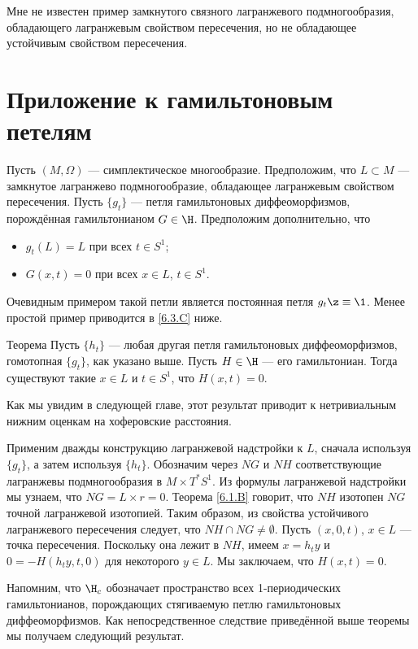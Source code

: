 Мне не известен пример замкнутого связного лагранжевого подмногообразия, обладающего лагранжевым свойством пересечения, но не обладающее устойчивым свойством пересечения.


\section{Приложение к гамильтоновым петелям}

Пусть $(M, \Omega)$ --- симплектическое многообразие.
Предположим, что $L \subset M$ --- замкнутое лагранжево подмногообразие, обладающее лагранжевым свойством пересечения.
Пусть $\{g_t\}$ --- петля гамильтоновых диффеоморфизмов, порождённая гамильтонианом $G \in \H$.
Предположим дополнительно, что
\begin{itemize}
\item $g_t (L) = L$ при всех $t \in S^1$; 
\item $G (x, t) = 0$ при всех $x \in L$, $t \in S^1$.
\end{itemize}
Очевидным примером такой петли является постоянная петля $g_t \z\equiv \1$.
Менее простой пример приводится в \ref{6.3.C} ниже.

\begin{thm}{Теорема}\label{6.3.A}
Пусть $\{h_t\}$ --- любая другая петля гамильтоновых диффеоморфизмов, гомотопная $\{g_t\}$, как указано выше.
Пусть $H \in \H$ --- его гамильтониан.
Тогда существуют такие $x \in L$ и $t \in S^1$, что $H (x, t) = 0$.
\end{thm}

Как мы увидим в следующей главе, этот результат приводит к нетривиальным нижним оценкам на хоферовские расстояния.

Применим дважды конструкцию лагранжевой надстройки к $L$, сначала используя $\{g_t\}$, а затем используя $\{h_t\}$.
Обозначим через $NG$ и $NH$ соответствующие лагранжевы подмногообразия в $M \times T^\ast S^1$.
Из формулы лагранжевой надстройки мы узнаем, что $NG = L \times {r = 0}$.
Теорема \ref{6.1.B} говорит, что $NH$ изотопен $NG$ точной лагранжевой изотопией.
Таким образом, из свойства устойчивого лагранжевого пересечения следует, что $NH \cap NG \ne \emptyset$.
Пусть $(x, 0, t)$, $x \in L$ --- точка пересечения.
Поскольку она лежит в $NH$, имеем $x = h_t y$ и $0 = -H (h_t y, t, 0)$ для некоторого $y \in L$.
Мы заключаем, что $H (x, t) = 0$.
\qeds

Напомним, что $\H_c$ обозначает пространство всех 1-периодических гамильтонианов, порождающих стягиваемую петлю гамильтоновых диффеоморфизмов.
Как непосредственное следствие приведённой выше теоремы мы получаем следующий результат.

